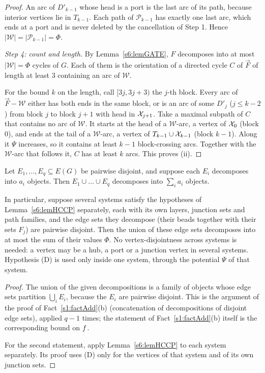 \begin{proof}
An arc of $D'_{k-1}$ whose head is a port is the last arc of its path, because interior vertices lie in $T_{k-1}$. Each path of $\mathcal P_{k-1}$ has exactly one last arc, which ends at a port and is never deleted by the cancellation of Step 1. Hence $|\mathcal W|=|\mathcal P_{k-1}|=\Phi$.

\emph{Step 4: count and length.} By Lemma~\ref{s6:lemGATE}, $F$ decomposes into at most $|\mathcal W|=\Phi$ cycles of $G$. Each of them is the orientation of a directed cycle $C$ of $\vec F$ of length at least $3$ containing an arc of $\mathcal W$.

For the bound $k$ on the length, call $[3j,3j+3)$ the $j$-th block. Every arc of $\vec F-\mathcal W$ either has both ends in the same block, or is an arc of some $D'_j$ ($j\le k-2$) from block $j$ to block $j+1$ with head in $\mathcal{X}_{j+1}$. Take a maximal subpath of $C$ that contains no arc of $\mathcal W$. It starts at the head of a $\mathcal W$-arc, a vertex of $\mathcal{X}_0$ (block $0$), and ends at the tail of a $\mathcal W$-arc, a vertex of $T_{k-1}\cup\mathcal{X}_{k-1}$ (block $k-1$). Along it $\Psi$ increases, so it contains at least $k-1$ block-crossing arcs. Together with the $\mathcal W$-arc that follows it, $C$ has at least $k$ arcs. This proves (ii).
\end{proof}

\begin{lemma}\label{s6:lemHCCglob}
Let $E_1,\dots,E_q\subseteq E(G)$ be pairwise disjoint, and suppose each $E_i$ decomposes into $a_i$ objects. Then $E_1\cup\dots\cup E_q$ decomposes into $\sum_ia_i$ objects.

In particular, suppose several systems satisfy the hypotheses of Lemma~\ref{s6:lemHCCP} separately, each with its own layers, junction sets and path families, and the edge sets they decompose (their beads together with their sets $F_j$) are pairwise disjoint. Then the union of these edge sets decomposes into at most the sum of their values $\Phi$. No vertex-disjointness across systems is needed: a vertex may be a hub, a port or a junction vertex in several systems. Hypothesis (D) is used only inside one system, through the potential $\Psi$ of that system.
\deps{\ref{s1:factAdd}, \ref{s6:lemHCCP}}
\end{lemma}

\begin{proof}
The union of the given decompositions is a family of objects whose edge sets partition $\bigcup_iE_i$, because the $E_i$ are pairwise disjoint. This is the argument of the proof of Fact~\ref{s1:factAdd}(b) (concatenation of decompositions of disjoint edge sets), applied $q-1$ times; the statement of Fact~\ref{s1:factAdd}(b) itself is the corresponding bound on $f$.

For the second statement, apply Lemma~\ref{s6:lemHCCP} to each system separately. Its proof uses (D) only for the vertices of that system and of its own junction sets.
\end{proof}

